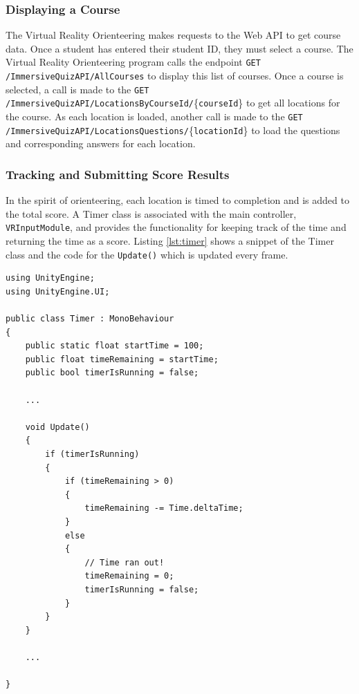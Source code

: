 \subsubsection{Displaying a Course}
The Virtual Reality Orienteering makes requests to the Web API to get course data. Once a student has entered their student ID, they must select a course. The Virtual Reality Orienteering program calls the endpoint \lstinline{GET /ImmersiveQuizAPI/AllCourses} to display this list of courses. Once a course is selected, a call is made to the \lstinline{GET /ImmersiveQuizAPI/LocationsByCourseId/}\{\lstinline{courseId}\} to get all locations for the course. As each location is loaded, another call is made to the \lstinline{GET /ImmersiveQuizAPI/LocationsQuestions/}\{\lstinline{locationId}\} to load the questions and corresponding answers for each location. 

\subsubsection{Tracking and Submitting Score Results}
In the spirit of orienteering, each location is timed to completion and is added to the total score. A Timer class is associated with the main controller, \lstinline{VRInputModule}, and provides the functionality for keeping track of the time and returning the time as a score. Listing \ref{lst:timer} shows a snippet of the Timer class and the code for the \lstinline{Update()} which is updated every frame.
\begin{lstlisting}[caption=Timer Update Snippet,label=lst:timer]
using UnityEngine;
using UnityEngine.UI;

public class Timer : MonoBehaviour
{
	public static float startTime = 100;
	public float timeRemaining = startTime;
	public bool timerIsRunning = false;
	
	...
	
	void Update()
	{
		if (timerIsRunning)
		{
			if (timeRemaining > 0)
			{
				timeRemaining -= Time.deltaTime;
			}
			else
			{
				// Time ran out!
				timeRemaining = 0;
				timerIsRunning = false;
			}
		}
	}

	...

}
\end{lstlisting} 

